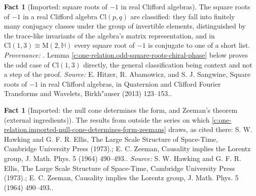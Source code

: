 \documentclass[11pt]{article}
\theoremstyle{definition}
\newtheorem{fact}[theorem]{Fact}
\theoremstyle{plain}
\providecommand{\Cl}{}\renewcommand{\Cl}{\mathrm{Cl}}
\providecommand{\Mat}{}\renewcommand{\Mat}{\mathrm{M}}
\begin{document}
\begin{fact}[Imported: square roots of $-1$ in real Clifford algebras]\label{c:one-relation.imported-square-roots-real-clifford-algebras}
The square roots of $-1$ in a real Clifford algebra $\Cl(p,q)$ are classified: they fall into finitely many conjugacy classes under the group of invertible elements, distinguished by the trace-like invariants of the algebra's matrix representation, and in $\Cl(1,3) \cong \Mat(2, \mathbb{H})$ every square root of $-1$ is conjugate to one of a short list. \emph{Provenance:} \cite{HitzerAblamowiczSangwine2013}. Lemma \ref{c:one-relation.odd-square-roots-chiral-phase} below proves the odd case of $\Cl(1,3)$ directly, the general classification being context and not a step of the proof.
\emph{Source:} E. Hitzer, R. Abamowicz, and S. J. Sangwine, Square roots of $-1$ in real Clifford algebras, in Quaternion and Clifford Fourier Transforms and Wavelets, Birkh"auser (2013) 123--153..
\end{fact}

\begin{fact}[Imported: the null cone determines the form, and Zeeman's theorem (external ingredients)]\label{c:one-relation.imported-null-cone-determines-form-zeemans-external}
The results from outside the series on which \ref{c:one-relation.imported-null-cone-determines-form-zeemans} draws, as cited there: S. W. Hawking and G. F. R. Ellis, The Large Scale Structure of Space-Time, Cambridge University Press (1973).; E. C. Zeeman, Causality implies the Lorentz group, J. Math. Phys. 5 (1964) 490--493..
\emph{Source:} S. W. Hawking and G. F. R. Ellis, The Large Scale Structure of Space-Time, Cambridge University Press (1973).; E. C. Zeeman, Causality implies the Lorentz group, J. Math. Phys. 5 (1964) 490--493..
\end{fact}
\end{document}

